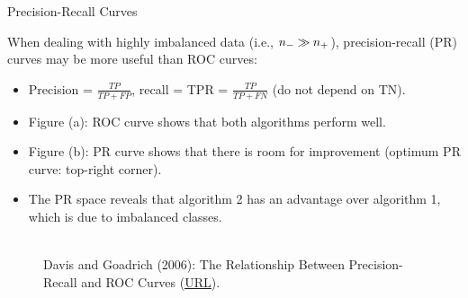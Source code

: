 \begin{vbframe}{Precision-Recall Curves}


\begin{footnotesize}

When dealing with highly imbalanced data (i.e., $n_{-} \gg n_{+}$), precision-recall 
(PR) curves may be more useful than ROC curves:

\begin{itemize}
  \item Precision = $\frac{TP}{TP + FP}$, recall = TPR = $\frac{TP}{TP + FN}$ 
  (do not depend on TN).
  \item Figure (a): ROC curve shows that both algorithms perform well.
  \item Figure (b): PR curve shows that there is room for improvement (optimum 
  PR curve: top-right corner).
  \item The PR space reveals that algorithm 2 has an advantage over algorithm 1, 
  which is due to imbalanced classes.
\end{itemize}

\end{footnotesize}

\begin{figure}
  \centering
  \tiny
  \\Davis and Goadrich (2006): The Relationship Between Precision-Recall and 
  ROC Curves (\href{https://www.biostat.wisc.edu/~page/rocpr.pdf}
  {\underline{URL}}).
\end{figure}


\end{vbframe}
